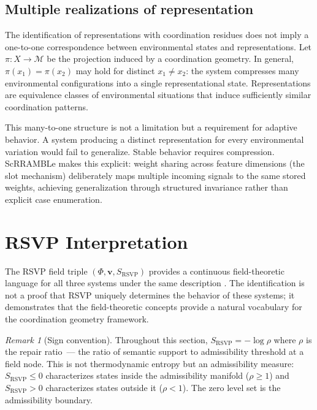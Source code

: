 \documentclass[11pt, a4paper]{article}
\theoremstyle{definition}
\theoremstyle{remark}
\newtheorem{remark}{Remark}
\begin{document}
\subsection*{Multiple realizations of representation}

The identification of representations with coordination residues does not
imply a one-to-one correspondence between environmental states and
representations. Let $\pi: X \to \mathcal{M}$ be the projection induced
by a coordination geometry. In general, $\pi(x_1) = \pi(x_2)$ may hold for
distinct $x_1 \neq x_2$: the system compresses many environmental
configurations into a single representational state. Representations are
equivalence classes of environmental situations that induce sufficiently
similar coordination patterns.

This many-to-one structure is not a limitation but a requirement for adaptive
behavior. A system producing a distinct representation for every environmental
variation would fail to generalize. Stable behavior requires compression.
ScRRAMBLe makes this explicit: weight sharing across feature dimensions
(the slot mechanism) deliberately maps multiple incoming signals to the same
stored weights, achieving generalization through structured invariance rather
than explicit case enumeration.

\section{RSVP Interpretation}

The RSVP field triple $(\Phi, \mathbf{v}, S_{\mathrm{RSVP}})$ provides a
continuous field-theoretic language for all three systems under the same
description \cite{freeman2000}. The identification is not a proof that RSVP
uniquely determines the behavior of these systems; it demonstrates that the
field-theoretic concepts provide a natural vocabulary for the coordination
geometry framework.

\begin{remark}[Sign convention]
Throughout this section, $S_{\mathrm{RSVP}} = -\log\rho$ where $\rho$ is
the repair ratio~--- the ratio of semantic support to admissibility threshold
at a field node. This is not thermodynamic entropy but an admissibility
measure: $S_{\mathrm{RSVP}} \leq 0$ characterizes states inside the
admissibility manifold ($\rho \geq 1$) and $S_{\mathrm{RSVP}} > 0$
characterizes states outside it ($\rho < 1$). The zero level set is the
admissibility boundary.
\end{remark}
\end{document}
